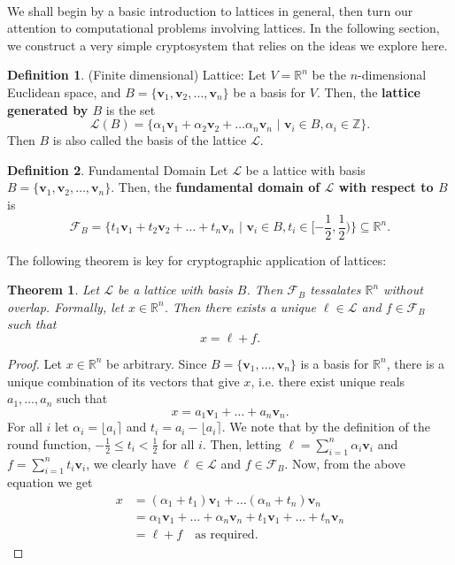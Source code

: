 \documentclass{article}
\newtheorem{theorem}{Theorem}[section]
\theoremstyle{definition}
\newtheorem{definition}{Definition}[section]
\theoremstyle{example}
\renewcommand{\L}{\mathcal{L}}
\newcommand{\F}{\mathcal{F}}
\newcommand{\Int}{\mathbb{Z}}
\newcommand{\Reals}{\mathbb{R}}
\renewcommand{\vec}[1]{\mathbf{#1}}
\begin{document}
\paragraph{} We shall begin by a basic introduction to lattices in general, then
turn our attention to computational problems involving lattices. In the
following section, we construct a very simple cryptosystem that relies on the
ideas we explore here.
\begin{definition}{(Finite dimensional) Lattice:}
  Let $V = \Reals^n$ be the $n$-dimensional Euclidean space, and $B = \{\vec{v}_1,
  \vec{v}_2, \hdots, \vec{v}_n\}$ be a basis for $V$. Then, the \textbf{lattice generated by $B$} is the set
  \[
    \L(B) = \{\alpha_1\vec{v}_1 + \alpha_2\vec{v}_2 + \hdots \alpha_n\vec{v}_n\,\,|\,\, \vec{v}_i \in B,
    \alpha_i \in \Int\}.
  \]
  Then $B$ is also called the basis of the lattice $\L$.
\end{definition}
\begin{definition}{Fundamental Domain}
  Let $\L$ be a lattice with basis $B = \{\vec{v}_1, \vec{v}_2, \hdots, \vec{v}_n\}$. Then, the
  \textbf{fundamental domain of $\L$ with respect to $B$} is
  \[
    \F_B = \{t_1\vec{v}_1 + t_2\vec{v}_2 + \hdots + t_n\vec{v}_n \,\,|\,\, \vec{v}_i \in B, t_i \in [-\frac12,
    \frac12)\} \subseteq \Reals^n.
  \]
\end{definition}
The following theorem is key for cryptographic application of lattices:
\begin{theorem}
  Let $\L$ be a lattice with basis $B$. Then $\F_B$ tessalates $\Reals^n$
  without overlap. Formally, let $x \in \Reals^n$. Then there exists a unique $\ell \in \L$
  and $f \in \F_B$ such that
\[
  x = \ell + f.
\]
\end{theorem}
\begin{proof}
  Let $x \in \Reals^n$ be arbitrary. Since $B = \{ \vec{v}_1, \hdots, \vec{v}_n \}$ is a basis for $\Reals^n$, there
  is a unique combination of its vectors that give $x$, i.e. there exist unique
  reals $a_1, \hdots, a_n$ such that
  \[
    x = a_1\vec{v}_1 + \hdots + a_n\vec{v}_n.
  \]
  For all $i$ let $\alpha_i = \lfloor a_i \rceil$ and $t_i = a_i - \lfloor a_i
  \rceil$. We note that by the definition of the round function, $-\frac12 \leq t_i <
  \frac12$ for all $i$. Then, letting $\ell = \sum_{i = 1}^n \alpha_i\vec{v}_i$ and $f
  = \sum_{i = 1}^n t_i\vec{v}_i$, we clearly have $\ell \in \L$ and $f \in
  \F_B$. Now, from the above equation we get
  \begin{align*}
    x &= (\alpha_1 + t_1)\vec{v}_1 + \hdots (\alpha_n + t_n)\vec{v}_n \\
      &= \alpha_1\vec{v}_1 + \hdots + \alpha_n\vec{v}_n + t_1\vec{v}_1 + \hdots + t_n\vec{v}_n \\
      &= \ell + f \quad \text{as required.}
  \end{align*}
\end{proof}
\end{document}

